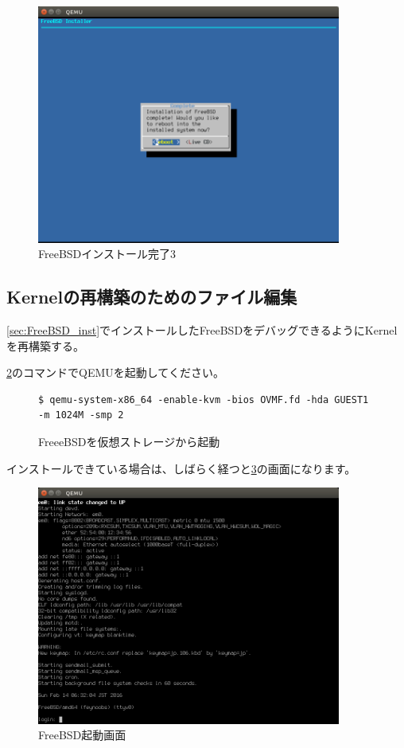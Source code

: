 \documentclass[a4j]{jarticle}
\begin{document}
\begin{multicols}{2}
\begin{figure}[htbp]
\begin{center}
    	\includegraphics[width=10cm]{./IMG/FreeBSD_ALL_LAS.png}
	\end{center}
    \caption{FreeBSDインストール完了3}
    \label{fig:FreeBSD_FIN_3}
\end{figure}


\subsection{Kernelの再構築のためのファイル編集}
\ref{sec:FreeBSD_inst}でインストールしたFreeBSDをデバッグできるようにKernelを再構築する。

\ref{fig:FreeBSD_boot_com}のコマンドでQEMUを起動してください。
\begin{figure}[htbp]
	\begin{center}
		\begin{lstlisting}[basicstyle=\ttfamily\footnotesize, frame=single, breaklines=true]
$ qemu-system-x86_64 -enable-kvm -bios OVMF.fd -hda GUEST1 -m 1024M -smp 2
	    \end{lstlisting}
	\end{center}
	\caption{FreeeBSDを仮想ストレージから起動}
	\label{fig:FreeBSD_boot_com}
\end{figure}

インストールできている場合は、しばらく経つと\ref{fig:FreeBSD_BOOT}の画面になります。
\begin{figure}[htbp]
	\begin{center}
    	\includegraphics[width=10cm]{./IMG/FreeBSD_BOOT.png}
	\end{center}
    \caption{FreeBSD起動画面}
    \label{fig:FreeBSD_BOOT}
\end{figure}


\end{multicols}
\end{document}
